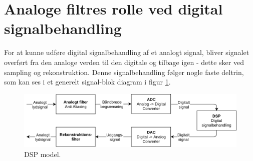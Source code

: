
\section{Analoge filtres rolle ved digital signalbehandling}\label{sec:filter_intro}
For at kunne udføre digital signalbehandling af et analogt signal, bliver signalet overført fra den analoge verden til den digitale og tilbage igen - dette sker ved sampling og rekonstruktion.
Denne signalbehandling følger nogle faste deltrin, som kan ses i et generelt signal-blok diagram i figur \ref{fig:dsp_model}. 
\begin{figure}[h!]
	\centering
	\includegraphics[width=1\textwidth]{billeder/dsp_model.png}
	\caption{DSP model.}
	\label{fig:dsp_model}
\end{figure}

